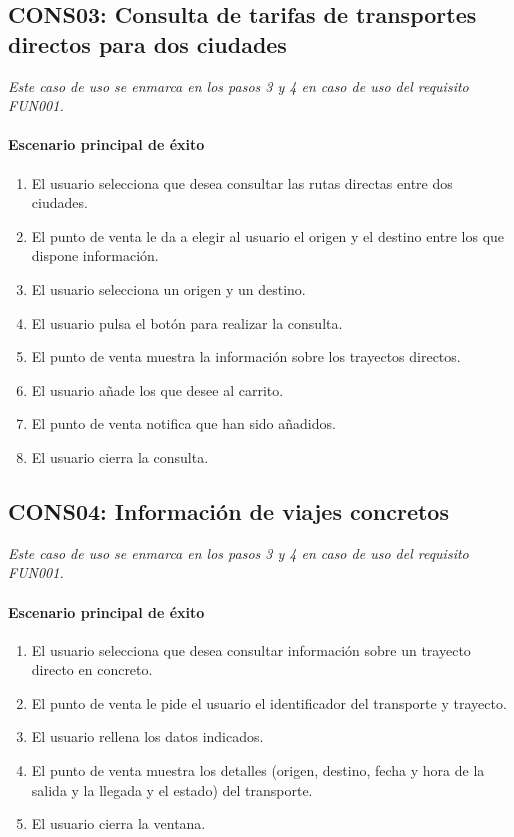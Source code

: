   \subsection{CONS03: Consulta de tarifas de transportes directos para dos ciudades}
    \emph{Este caso de uso se enmarca en los pasos 3 y 4 en caso de uso del requisito FUN001.}
    \paragraph{Escenario principal de éxito}
    \begin{enumerate}
      \item El usuario selecciona que desea consultar las rutas directas entre dos ciudades.
      \item El punto de venta le da a elegir al usuario el origen y el destino entre los que dispone información.
      \item El usuario selecciona un origen y un destino.
      \item El usuario pulsa el botón para realizar la consulta.
      \item El punto de venta muestra la información sobre los trayectos directos.
      \item El usuario añade los que desee al carrito.
      \item El punto de venta notifica que han sido añadidos.
      \item El usuario cierra la consulta.
    \end{enumerate}

  \subsection{CONS04: Información de viajes concretos}
    \emph{Este caso de uso se enmarca en los pasos 3 y 4 en caso de uso del requisito FUN001.}
    \paragraph{Escenario principal de éxito}
    \begin{enumerate}
      \item El usuario selecciona que desea consultar información sobre un trayecto directo en concreto.
      \item El punto de venta le pide el usuario el identificador del transporte y trayecto.
      \item El usuario rellena los datos indicados.
      \item El punto de venta muestra los detalles (origen, destino, fecha y hora de la salida y la llegada y el estado) del transporte.
      \item El usuario cierra la ventana.
    \end{enumerate}
